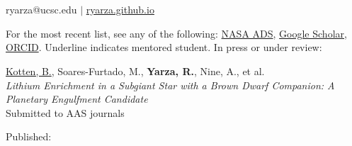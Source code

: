 \documentclass[12pt]{article}
\begin{document}
{\\\vspace{0.5em}{\large Publication list}\\\vspace{0.5em}
ryarza@ucsc.edu \(|\) \href{https://ryarza.github.io}{ryarza.github.io}

}
For the most recent list, see any of the following: \href{\adslibrary}{NASA ADS}, \href{\googlescholar}{Google Scholar}, \href{https://orcid.org/0000-0003-0381-1039}{ORCID}.
Underline indicates mentored student.
\ifdefined\withunpublished{}
In press or under review:
\begin{etaremune}
\item \underline{Kotten, B.}, Soares-Furtado, M., \textbf{Yarza, R.}, Nine, A., et al.\\\textit{Lithium Enrichment in a Subgiant Star with a Brown Dwarf Companion: A Planetary Engulfment Candidate}\\Submitted to AAS journals

\end{etaremune}
Published:
\else\fi
\begin{etaremune}

\end{etaremune}
\end{document}
